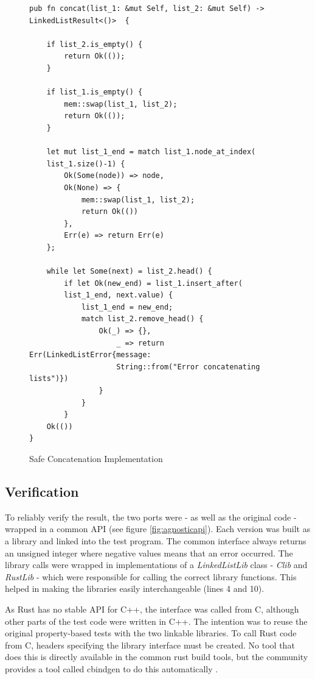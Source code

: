 \begin{figure}[H]
 \vspace{12pt}
\begin{lstlisting}[style=RUSTSTYLE]
pub fn concat(list_1: &mut Self, list_2: &mut Self) -> 
LinkedListResult<()>  {
    
    if list_2.is_empty() {
        return Ok(());
    }

    if list_1.is_empty() {
        mem::swap(list_1, list_2);
        return Ok(());
    }

    let mut list_1_end = match list_1.node_at_index(
    list_1.size()-1) {
        Ok(Some(node)) => node,
        Ok(None) => {
            mem::swap(list_1, list_2);
            return Ok(())
        },
        Err(e) => return Err(e) 
    };
        
    while let Some(next) = list_2.head() {
        if let Ok(new_end) = list_1.insert_after(
        list_1_end, next.value) {
            list_1_end = new_end; 
            match list_2.remove_head() {
                Ok(_) => {},
                    _ => return Err(LinkedListError{message:
                    String::from("Error concatenating lists")})
                }
            }
        }
    Ok(())
}
\end{lstlisting}
    \caption{Safe Concatenation Implementation}
    \label{fig:safeconcat}
\end{figure}


\subsection{Verification}


To reliably verify the result, the two ports were - as well as the original code - wrapped in a common API (see figure \ref{fig:agnosticapi}). Each version was built as a library and linked into the test program. The common interface always returns an unsigned integer where negative values means that an error occurred. The library calls were wrapped in implementations of a \textit{LinkedListLib} class - \textit{Clib} and \textit{RustLib} - which were responsible for calling the correct library functions. This helped in making the libraries easily interchangeable (lines 4 and 10). 

As Rust has no stable API for C++, the interface was called from C, although other parts of the test code were written in C++. The intention was to reuse the original property-based tests with the two linkable libraries. To call Rust code from C, headers specifying the library interface must be created. No tool that does this is directly available in the common rust build tools, but the community provides a tool called cbindgen to do this automatically \cite{CBINDGEN}.

